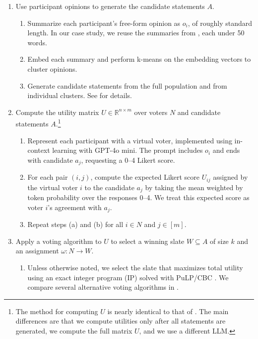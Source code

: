 \documentclass[letterpaper]{article} %
\begin{document}
\begin{enumerate}
    \item Use participant opinions to generate the candidate statements \(A\).
    \begin{enumerate}
        \item Summarize each participant's free-form opinion as \(o_i\), of roughly standard length.
        In our case study, we reuse the summaries from \citet{fish-v2}, each under 50 words.
        \item Embed each summary and perform k-means on the embedding vectors to cluster opinions.
        \item Generate candidate statements from the full population and from individual clusters.
        See  for details.
    \end{enumerate}

    \item Compute the utility matrix \(U\in \mathbb{R}^{n\times m}\) over voters \(N\) and candidate statements \(A\).\footnote{The method for computing \(U\) is nearly identical to that of \citet{fish-v2}.
    The main differences are that we compute utilities only after all statements are generated, we compute the full matrix \(U\), and we use a different LLM.}
    \begin{enumerate}
        \item Represent each participant with a virtual voter, implemented using in-context learning \citep{xie-in-context-learning-2021} with GPT-4o mini.
        The prompt includes \(o_i\) and ends with candidate \(a_j\), requesting a 0--4 Likert score.
        \item For each pair \((i,j)\), compute the expected Likert score \(U_{ij}\) assigned by the virtual voter \(i\) to the candidate \(a_j\) by taking the mean weighted by token probability over the responses 0--4.
        We treat this expected score as voter \(i\)'s agreement with \(a_j\).
        \item Repeat steps (a) and (b) for all \(i\in N\) and \(j\in[m]\).
    \end{enumerate}

    \item Apply a voting algorithm to \(U\) to select a winning slate \(W\subseteq A\) of size \(k\) and an assignment \(\omega:N\to W\).
    \begin{enumerate}
        \item Unless otherwise noted, we select the slate that maximizes total utility using an exact integer program (IP) solved with PuLP/CBC \citep{pulp, john_forrest_cbc}.
        We compare several alternative voting algorithms in .
    \end{enumerate}
\end{enumerate}
\end{document}
